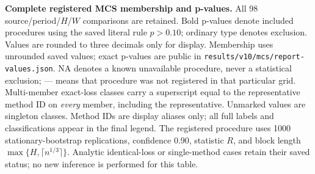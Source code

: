 \begingroup
\fontsize{7.1}{8.5}\selectfont
\setlength{\tabcolsep}{1.35pt}
\renewcommand{\arraystretch}{1.06}
\setlength{\LTcapwidth}{\linewidth}
\noindent\textbf{Complete registered MCS membership and p-values.}
All 98 source/period/$H$/$W$ comparisons are retained. Bold p-values denote included procedures using the saved literal rule $p>0.10$; ordinary type denotes exclusion. Values are rounded to three decimals only for display. Membership uses unrounded saved values; exact p-values are public in \texttt{results/v10/mcs/report-values.json}. \textsc{NA} denotes a known unavailable procedure, never a statistical exclusion; --- means that procedure was not registered in that particular grid.
Multi-member exact-loss classes carry a superscript equal to the representative method ID on \emph{every} member, including the representative. Unmarked values are singleton classes. Method IDs are display aliases only; all full labels and classifications appear in the final legend.
The registered procedure uses 1000 stationary-bootstrap replications, confidence 0.90, statistic $R$, and block length $\max\{H,\lceil n^{1/3}\rceil\}$. Analytic identical-loss or single-method cases retain their saved status; no new inference is performed for this table.

